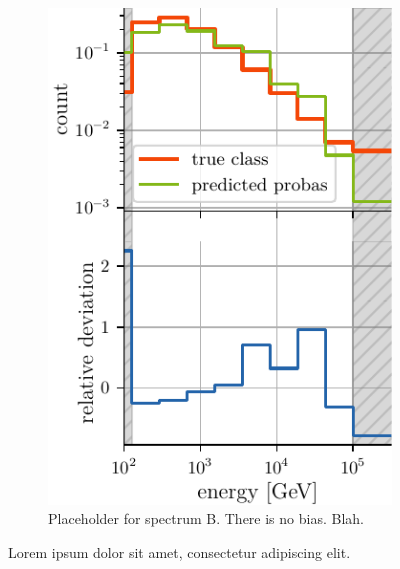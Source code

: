 \begin{figure}[H]
\begin{subfigure}{0.45\textwidth}
        \includegraphics[width=\textwidth]{content/plots/bootstrap:spectrum_half.pdf}
        \caption{
            Placeholder for spectrum B.
            There is no bias. Blah.
        }
    \end{subfigure}
    \caption{Lorem ipsum dolor sit amet, consectetur adipiscing elit.}
    \label{fig:bias_comparison}
\end{figure}
